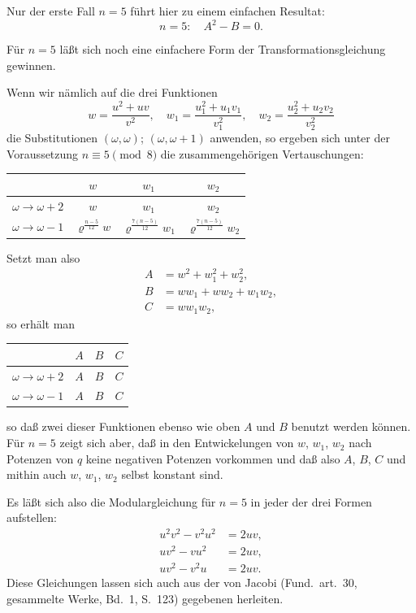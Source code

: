 \documentclass[12pt,a4paper]{article}
\theoremstyle{definition}
\begin{document}
Nur der erste Fall $n = 5$ führt hier zu einem einfachen Resultat:
\begin{equation}\label{eq:75-16}
n = 5:\quad A^2 - B = 0.
\end{equation}

Für $n = 5$ läßt sich noch eine einfachere Form der Transformationsgleichung gewinnen.

Wenn wir nämlich auf die drei Funktionen
\[
w = \frac{u^2 + uv}{v^2}, \quad w_1 = \frac{u_1^2 + u_1v_1}{v_1^2}, \quad w_2 = \frac{u_2^2 + u_2v_2}{v_2^2}
\]
die Substitutionen $(\omega, \omega)$; $(\omega, \omega + 1)$ anwenden, so ergeben sich unter der Voraussetzung $n \equiv 5 \pmod{8}$ die zusammengehörigen Vertauschungen:

\begin{center}
\begin{tabular}{c|ccc}
& $w$ & $w_1$ & $w_2$ \\
\midrule
$\omega \to \omega + 2$ & $w$ & $w_1$ & $w_2$ \\
$\omega \to \omega - 1$ & $\varrho^{\frac{n-5}{12}} w$ & $\varrho^{\frac{7(n-5)}{12}} w_1$ & $\varrho^{\frac{7(n-5)}{12}} w_2$ \\
\end{tabular}
\end{center}

Setzt man also
\[
\begin{aligned}
A &= w^2 + w_1^2 + w_2^2, \\
B &= ww_1 + ww_2 + w_1w_2, \\
C &= ww_1w_2,
\end{aligned}
\]
so erhält man

\begin{center}
\begin{tabular}{c|ccc}
& $A$ & $B$ & $C$ \\
\midrule
$\omega \to \omega + 2$ & $A$ & $B$ & $C$ \\
$\omega \to \omega - 1$ & $A$ & $B$ & $C$ \\
\end{tabular}
\end{center}

so daß zwei dieser Funktionen ebenso wie oben $A$ und $B$ benutzt werden können. Für $n = 5$ zeigt sich aber, daß in den Entwickelungen von $w$, $w_1$, $w_2$ nach Potenzen von $q$ keine negativen Potenzen vorkommen und daß also $A$, $B$, $C$ und mithin auch $w$, $w_1$, $w_2$ selbst konstant sind.

Es läßt sich also die Modulargleichung für $n = 5$ in jeder der drei Formen aufstellen:
\begin{equation}\label{eq:75-18}
\begin{aligned}
u^2 v^2 - v^2 u^2 &= 2uv, \\
u v^2 - v u^2 &= 2uv, \\
u v^2 - v^2 u &= 2uv.
\end{aligned}
\end{equation}
Diese Gleichungen lassen sich auch aus der von Jacobi (Fund.\ art.\ 30, gesammelte Werke, Bd.~1, S.~123) gegebenen herleiten.
\end{document}
